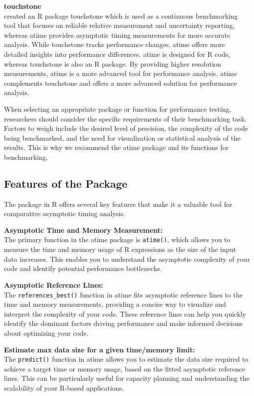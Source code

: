 \textbf{touchstone} \\
\citet{touchstone} created an R package touchstone which is used as a continuous benchmarking tool that focuses on reliable relative measurement and uncertainty reporting, whereas atime provides asymptotic timing measurements for more accurate analysis. While touchstone tracks performance changes, atime offers more detailed insights into performance differences. atime is designed for R code, whereas touchstone is also an R package. By providing higher resolution measurements, atime is a more advanced tool for performance analysis. atime complements touchstone and offers a more advanced solution for performance analysis.

    
\noindent When selecting an appropriate package or function for performance testing, researchers should consider the specific requirements of their benchmarking task. Factors to weigh include the desired level of precision, the complexity of the code being benchmarked, and the need for visualization or statistical analysis of the results. This is why we recommend the atime package and its functions for benchmarking.

\subsection{Features of the Package}
The   package in R offers several key features that make it a valuable tool for comparative asymptotic timing analysis.

\textbf{Asymptotic Time and Memory Measurement:} \\
The primary function in the atime package is \texttt{atime()}, which allows you to measure the time and memory usage of R expressions as the size of the input data increases. This enables you to understand the asymptotic complexity of your code and identify potential performance bottlenecks.
\vspace{0.1in}

\textbf{Asymptotic Reference Lines:} \\
The \texttt{references\_best()} function in atime fits asymptotic reference lines to the time and memory measurements, providing a concise way to visualize and interpret the complexity of your code. These reference lines can help you quickly identify the dominant factors driving performance and make informed decisions about optimizing your code.
\vspace{0.1in}

\textbf{Estimate max data size for a given time/memory limit:} \\
The \texttt{predict()} function in atime allows you to estimate the data size required to achieve a target time or memory usage, based on the fitted asymptotic reference lines. This can be particularly useful for capacity planning and understanding the scalability of your R-based applications.
\vspace{0.1in}

